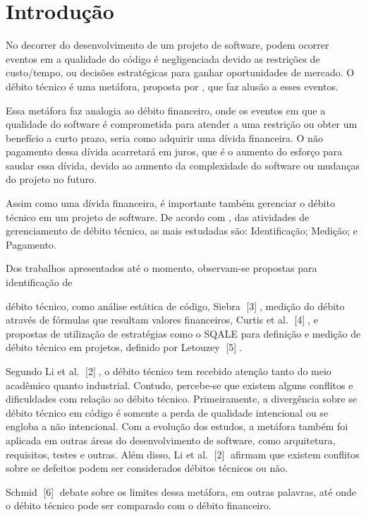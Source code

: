 \chapter[Introdução]{Introdução}

No decorrer do desenvolvimento de um projeto de software, podem ocorrer eventos
em a qualidade do código é negligenciada devido as restrições de custo/tempo,
ou decisões estratégicas para ganhar oportunidades de mercado. O débito técnico
é uma metáfora, proposta por \cite{cunningham}, que faz alusão a esses eventos.

Essa metáfora faz analogia ao débito financeiro, onde os eventos em que a
qualidade do software é comprometida para atender a uma restrição ou obter
um benefício a curto prazo, seria como adquirir uma dívida financeira. O não
pagamento dessa dívida acarretará em juros, que é o aumento do esforço para
saudar essa dívida, devido ao aumento da complexidade do software ou mudanças
do projeto no futuro.

Assim como uma dívida financeira, é importante também gerenciar o débito técnico
em um projeto de software. De acordo com \cite{mapping}, das atividades de
gerenciamento de débito técnico, as mais estudadas são: Identificação; Medição; e Pagamento.


Dos trabalhos apresentados até o momento, observam-se propostas para identificação de

débito técnico, como análise estática de código, Siebra [3], medição do débito
através de fórmulas que resultam valores financeiros, Curtis et al. [4], e
propostas de utilização de estratégias como o SQALE para definição e medição de
débito técnico em projetos, definido por Letouzey [5].

Segundo Li et al. [2],  o débito técnico tem recebido atenção tanto do meio
acadêmico quanto industrial. Contudo, percebe-se que existem alguns conflitos e
dificuldades com relação ao débito técnico. Primeiramente, a divergência sobre
se débito técnico em código é somente a perda de qualidade intencional ou se
engloba a não intencional. Com a evolução dos estudos, a metáfora também foi
aplicada em outras áreas do desenvolvimento de software, como arquitetura,
requisitos, testes e outras. Além disso, Li et al. [2] afirmam que existem
conflitos sobre se defeitos podem ser considerados débitos técnicos ou não.

Schmid [6] debate sobre os limites dessa metáfora, em outras palavras, até onde
o débito técnico pode ser comparado com o débito financeiro.

